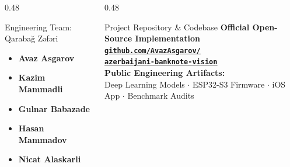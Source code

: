 \documentclass[aspectratio=169, 10pt]{beamer}
\begin{document}
\begin{frame}[plain]
    \vspace{0.20cm}
    \begin{columns}[c]
        \begin{column}{0.48\textwidth}
            \begin{techblock}{Engineering Team: Qarabağ Zəfəri}
                \small
                \begin{itemize}\setlength{\itemsep}{4pt}
                    \item \textbf{Avaz Asgarov}
                    \item \textbf{Kazim Mammadli}
                    \item \textbf{Gulnar Babazade}
                    \item \textbf{Hasan Mammadov}
                    \item \textbf{Nicat Alaskarli}
                \end{itemize}
            \end{techblock}
        \end{column}
        
        \begin{column}{0.48\textwidth}
            \begin{techblock}{Project Repository \& Codebase}
                \vspace{0.15cm}
                \centering
                {\footnotesize\bfseries\color{PrimaryNavy} Official Open-Source Implementation}\\[0.22cm]
                \href{https://github.com/AvazAsgarov/azerbaijani-banknote-vision}{%
                    \color{AccentBlue}\bfseries\small%
                    \underline{\texttt{github.com/AvazAsgarov/}}\\[0.08cm]%
                    \underline{\texttt{azerbaijani-banknote-vision}}%
                }\\[0.28cm]
                {\scriptsize\color{DarkSlate!85}\textbf{Public Engineering Artifacts:}}\\[0.08cm]
                {\tiny\color{DarkSlate!75} Deep Learning Models $\cdot$ ESP32-S3 Firmware $\cdot$ iOS App $\cdot$ Benchmark Audits}
                \vspace{0.15cm}
            \end{techblock}
        \end{column}
    \end{columns}
\end{frame}






\end{document}
